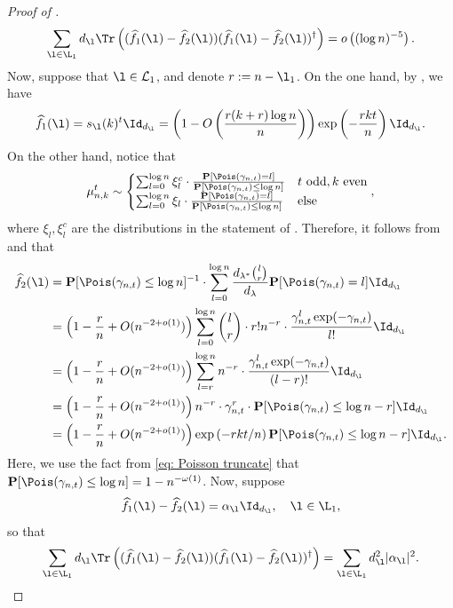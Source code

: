 \begin{proof}[Proof of ]
\begin{equation*}
\sum_{\l\in\L_1}d_\l\Tr\left((\widehat f_1(\l)-\widehat f_2(\l))(\widehat f_1(\l)-\widehat f_2(\l))^\dag\right)=o\left((\log n)^{-5}\right).
\end{equation*}
Now, suppose that $\l\in\mathcal{L}_1$, and denote $r:=n-\l_1$. On the one hand, by , we have
\begin{equation}
\widehat f_1(\l)=s_\l(k)^t\Id_{d_\l}=\left(1-O\left(\frac{r(k+r)\log n}{n}\right)\right)\exp\left(-\frac{rkt}{n}\right)\Id_{d_\l}.
\end{equation}
On the other hand, notice that
$$\mu_{n,k}^t\sim\begin{cases}
\sum_{l=0}^{\log n}\xi_l^c\cdot\frac{\mathbf{P}[\Pois(\gamma_{n,t})=l]}{\mathbf{P}[\Pois(\gamma_{n,t})\le\log n]} & t \text{ odd},k\text{ even}\\
\sum_{l=0}^{\log n}\xi_l\cdot\frac{\mathbf{P}[\Pois(\gamma_{n,t})=l]}{\mathbf{P}[\Pois(\gamma_{n,t})\le\log n]} & \text{else}
\end{cases},$$
where $\xi_l,\xi_l^c$ are the distributions in the statement of . Therefore, it follows from  and  that
\begin{align}
\begin{split}
\widehat f_2(\l)&=\mathbf{P}[\Pois(\gamma_{n,t})\le\log n]^{-1}\cdot\sum_{l=0}^{\log n}\frac{d_{\lambda^*}\binom{l}{r}}{d_\lambda}\mathbf{P}[\Pois(\gamma_{n,t})=l]\Id_{d_\l}\\
&=\left(1-\frac rn+O(n^{-2+o(1)})\right)\sum_{l=0}^{\log n}\binom{l}{r}\cdot r!n^{-r}\cdot\frac{\gamma_{n,t}^l \exp(-\gamma_{n,t})}{l !}\Id_{d_\l}\\
&=\left(1-\frac rn+O(n^{-2+o(1)})\right)\sum_{l=r}^{\log n}n^{-r}\cdot\frac{\gamma_{n,t}^l \exp(-\gamma_{n,t})}{(l-r)!}\Id_{d_\l}\\
&=\left(1-\frac rn+O(n^{-2+o(1)})\right)n^{-r}\cdot\gamma_{n,t}^r\cdot\mathbf{P}[\Pois(\gamma_{n,t})\le \log n-r]\Id_{d_\l}\\
&=\left(1-\frac rn+O(n^{-2+o(1)})\right)\exp\left(-rkt/n\right)\mathbf{P}[\Pois(\gamma_{n,t})\le\log n-r]\Id_{d_\l}.
\end{split}
\end{align}
Here, we use the fact from \eqref{eq: Poisson truncate} that $\mathbf{P}[\Pois(\gamma_{n,t})\le\log n]=1-n^{-\omega(1)}$. Now, suppose
$$\widehat f_1(\l)-\widehat f_2(\l)=\alpha_\l\Id_{d_\l},\quad \l\in\L_1,$$
so that 
$$\sum_{\l\in\L_1}d_\l\Tr\left((\widehat f_1(\l)-\widehat f_2(\l))(\widehat f_1(\l)-\widehat f_2(\l))^\dag\right)=\sum_{\l\in\L_1}d_{\l}^2|\alpha_{\l}|^2.$$

\end{proof}
